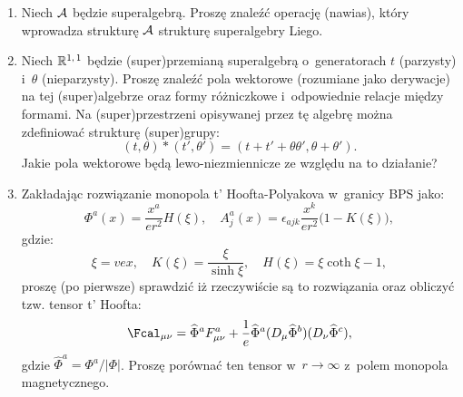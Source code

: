 \documentclass[a4paper,11pt]{article}
\begin{document}
\begin{enumerate}

\item Niech $\mathcal{A}$ będzie superalgebrą. Proszę znaleźć operację (nawias),
  który wprowadza strukturę $\mathcal{A}$ strukturę superalgebry Liego.

\item Niech $\mathbb{R}^{ 1,\, 1 }$ będzie (super)przemianą superalgebrą
  o~generatorach $t$ (parzysty) i~$\theta$ (nieparzysty). Proszę znaleźć pola
  wektorowe (rozumiane jako derywacje) na tej (super)algebrze oraz formy
  różniczkowe i~odpowiednie relacje między formami. Na (super)przestrzeni
  opisywanej przez tę algebrę można zdefiniować strukturę (super)grupy:
  \begin{equation}
    \label{eq:Superalgebry-01}
    ( t, \theta ) * ( t', \theta' ) = ( t + t' + \theta \theta', \theta + \theta' ).
  \end{equation}
  Jakie pola wektorowe będą lewo-niezmiennicze ze względu na to działanie?

\item Zakładając rozwiązanie monopola t' Hoofta-Polyakova w~granicy BPS
  jako:
  \begin{equation}
    \label{eq:Superalgebry-02}
    \Phi^{ a }( x ) = \frac{ x^{ a } }{ e r^{ 2 } } H( \xi ), \quad
    A_{ j }^{ a }( x ) =
    \epsilon_{ a j k } \frac{ x^{ k } }{ e r^{ 2 } } \big( 1 - K( \xi ) \big),
  \end{equation}
  gdzie:
  \begin{equation}
    \label{eq:Superalgebra-03}
    \xi = v e x, \quad
    K( \xi ) = \frac{ \xi }{ \sinh \xi }, \quad
    H( \xi ) = \xi \coth \xi - 1,
  \end{equation}
  proszę (po pierwsze) sprawdzić iż rzeczywiście są to rozwiązania oraz
  obliczyć tzw. tensor t' Hoofta:
  \begin{equation}
    \label{eq:Superalgebra-04}
    \Fcal_{ \mu \nu } =
    \widehat{\Phi}^{ a } F_{ \mu \nu }^{ a }
    + \frac{ 1 }{ e } \widehat{\Phi}^{ a } ( D_{ \mu } \widehat{\Phi}^{ b } )
    ( D_{ \nu } \widehat{\Phi}^{ c } ),
  \end{equation}
  gdzie $\widehat{\Phi}^{ a } = \Phi^{ a } / | \Phi |$. Proszę porównać ten tensor
  w~$r \to \infty$ z~polem monopola magnetycznego.


\end{enumerate}
\end{document}
